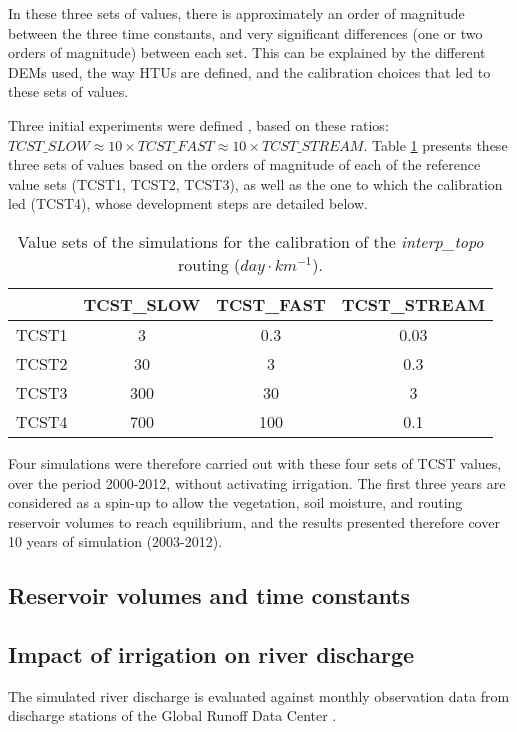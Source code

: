 In these three sets of values, there is approximately an order of magnitude between the three time constants, and very significant differences (one or two orders of magnitude) between each set. 
This can be explained by the different DEMs used, the way HTUs are defined, and the calibration choices that led to these sets of values.%

Three initial experiments were defined , based on these ratios:\\$TCST\_SLOW \approx 10 \times TCST\_FAST \approx 10 \times TCST\_STREAM$.
Table \ref{table:tcst_exp} presents these three sets of values based on the orders of magnitude of each of the reference value sets (TCST1, TCST2, TCST3), as well as the one to which the calibration led (TCST4), whose development steps are detailed below.

\begin{table}[h]
\centering
\begin{tabular}{|l|c|c|c|}
\hline
\textbf{} & \textbf{TCST\_SLOW} & \textbf{TCST\_FAST} & \textbf{TCST\_STREAM} \\ \hline
TCST1 & 3 & 0.3 & 0.03 \\ \hline
TCST2 & 30 & 3 & 0.3 \\ \hline
TCST3 & 300 & 30 & 3 \\ \hline
TCST4 & 700 & 100 & 0.1 \\ \hline
\end{tabular}
\caption{Value sets of the simulations for the calibration of the \textit{interp\_topo} routing ($day \cdot km^{-1}$).}
\label{table:tcst_exp}
\end{table}

Four simulations were therefore carried out with these four sets of TCST values, over the period 2000-2012, without activating irrigation.
The first three years are considered as a spin-up to allow the vegetation, soil moisture, and routing reservoir volumes to reach equilibrium, and the results presented therefore cover 10 years of simulation (2003-2012).

\subsection{Reservoir volumes and time constants}

\subsection{Impact of irrigation on river discharge}
The simulated river discharge is evaluated against monthly observation data from discharge stations of the Global Runoff Data Center \cite[GRDC, https://grdc.bafg.de,][]{fekete_global_2003}.

